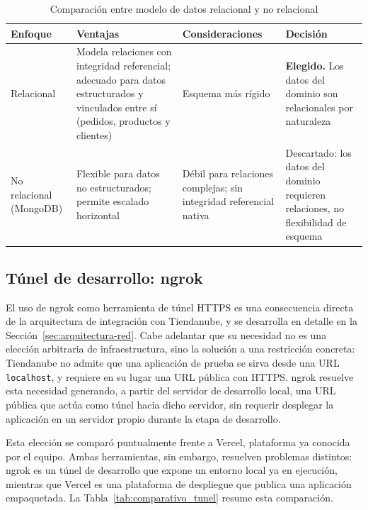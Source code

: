 \begin{table}[h]
\centering
\caption{Comparación entre modelo de datos relacional y no relacional}
\label{tab:comparativo_db_enfoque}
\renewcommand{\arraystretch}{1.3}
\begin{tabular}{|m{2.3cm}|m{4.4cm}|m{4.4cm}|m{3.4cm}|}
\hline
\textbf{Enfoque} & \textbf{Ventajas} & \textbf{Consideraciones} & \textbf{Decisión} \\
\hline
Relacional & Modela relaciones con integridad referencial; adecuado para datos estructurados y vinculados entre sí (pedidos, productos y clientes) & Esquema más rígido & \textbf{Elegido.} Los datos del dominio son relacionales por naturaleza \\
\hline
No relacional (MongoDB) & Flexible para datos no estructurados; permite escalado horizontal & Débil para relaciones complejas; sin integridad referencial nativa & Descartado: los datos del dominio requieren relaciones, no flexibilidad de esquema \\
\hline
\end{tabular}
\end{table}

\subsection{Túnel de desarrollo: ngrok}
\label{sec:tunel-ngrok}

El uso de ngrok como herramienta de túnel HTTPS es una consecuencia directa de la arquitectura de integración con Tiendanube, y se desarrolla en detalle en la Sección~\ref{sec:arquitectura-red}. Cabe adelantar que su necesidad no es una elección arbitraria de infraestructura, sino la solución a una restricción concreta: Tiendanube no admite que una aplicación de prueba se sirva desde una URL \texttt{localhost}, y requiere en su lugar una URL pública con HTTPS. ngrok resuelve esta necesidad generando, a partir del servidor de desarrollo local, una URL pública que actúa como túnel hacia dicho servidor, sin requerir desplegar la aplicación en un servidor propio durante la etapa de desarrollo.

Esta elección se comparó puntualmente frente a Vercel, plataforma ya conocida por el equipo. Ambas herramientas, sin embargo, resuelven problemas distintos: ngrok es un túnel de desarrollo que expone un entorno local ya en ejecución, mientras que Vercel es una plataforma de despliegue que publica una aplicación empaquetada. La Tabla~\ref{tab:comparativo_tunel} resume esta comparación.

